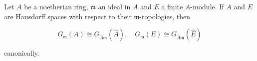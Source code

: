 Let $A$ be a noetherian ring, $\mathfrak{m}$ an ideal in $A$ and $E$ a finite $A$-module. If $A$ and $E$ are Hausdorff spaces with respect to their $\mathfrak{m}$-topologies, then

$$G_{\mathfrak{m}}(A) \cong G_{\hat{A}\mathfrak{m}}(\hat{A}), \quad G_{\mathfrak{m}}(E) \cong G_{\hat{A}\mathfrak{m}}(\hat{E})$$

canonically.